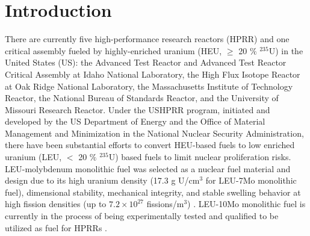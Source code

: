 \documentclass[preprint,12pt]{elsarticle}
\begin{document}
\section{Introduction}
There are currently five high-performance research reactors (HPRR) and one critical assembly fueled by highly-enriched uranium (HEU, $\geq$ 20 $\%$ $^{235}$U) in the United States (US): the Advanced Test Reactor and Advanced Test Reactor Critical Assembly at Idaho National Laboratory, the High Flux Isotope Reactor at Oak Ridge National Laboratory, the Massachusetts Institute of Technology Reactor, the National Bureau of Standards Reactor, and the University of Missouri Research Reactor. Under the USHPRR program, initiated and developed by the US Department of Energy and the Office of Material Management and Minimization in the National Nuclear Security Administration, there have been substantial efforts to convert HEU-based fuels to low enriched uranium (LEU, $<$ 20 $\%$ $^{235}$U) based fuels to limit nuclear proliferation risks. LEU-molybdenum monolithic fuel was selected as a nuclear fuel material and design due to its high uranium density (17.3 g U/cm$^{3}$ for LEU-7Mo monolithic fuel), dimensional stability, mechanical integrity, and stable swelling behavior at high fission densities (up to $7.2\times10^{27}$ fissions/m$^{3}$) \cite{kim2011fission, robinson2013irradiation, meyer2014irradiation, keiser2017observed, prabhakaran2017u, jue2018effects}. 
LEU-10Mo monolithic fuel is currently in the process of being experimentally tested and qualified to be utilized as fuel for HPRRs \cite{miller2021u, gan2017irradiated, giglio2021ushprr}.\\
\end{document}
